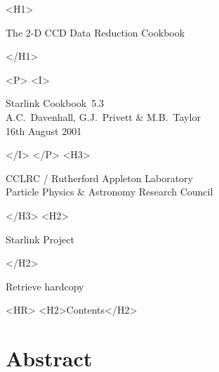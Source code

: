 \documentclass[twoside,11pt]{article}
\newcommand{\stardoccategory}  {Starlink Cookbook}
\newcommand{\stardocsource}    {sc\stardocnumber}
\newcommand{\stardocnumber}    {5.3}
\newcommand{\stardocauthors}   {A.C.~Davenhall, G.J.~Privett \& M.B.~Taylor}
\newcommand{\stardocdate}      {16th August 2001}
\newcommand{\stardoctitle}     {The 2-D CCD Data Reduction Cookbook}
\newcommand{\htmladdnormallink}[2]{#1}
\newcommand{\htmladdimg}[1]{}
\newcommand{\htmlref}[2]{#1}
\newcommand{\htmladdtonavigation}[1]{}
\newcommand{\xlabel}[1]{}
\newcommand{\latexonlytoc}[0]{\tableofcontents}
\newcommand{\latexonlylof}[0]{\listoffigures}
\newcommand{\latexonlylot}[0]{\listoftables}
\begin{document}
\begin{htmlonly}
   \xlabel{}
   \begin{rawhtml} <H1> \end{rawhtml}
      \stardoctitle
   \begin{rawhtml} </H1> \end{rawhtml}


   \begin{rawhtml} <P> <I> \end{rawhtml}
   \stardoccategory\ \stardocnumber \\
   \stardocauthors \\
   \stardocdate
   \begin{rawhtml} </I> </P> <H3> \end{rawhtml}
      \htmladdnormallink{CCLRC}{http://www.cclrc.ac.uk} /
      \htmladdnormallink{Rutherford Appleton Laboratory}
                        {http://www.cclrc.ac.uk/ral} \\
      \htmladdnormallink{Particle Physics \& Astronomy Research Council}
                        {http://www.pparc.ac.uk} \\
   \begin{rawhtml} </H3> <H2> \end{rawhtml}
      \htmladdnormallink{Starlink Project}{http://star-www.rl.ac.uk/}
   \begin{rawhtml} </H2> \end{rawhtml}
   \htmladdnormallink{\htmladdimg{source.gif} Retrieve hardcopy}
      {http://star-www.rl.ac.uk/cgi-bin/hcserver?\stardocsource}\\

  \label{stardoccontents}
  \begin{rawhtml} 
    <HR>
    <H2>Contents</H2>
  \end{rawhtml}
  \newcommand{\latexonlytoc}[0]{}
  \newcommand{\latexonlylof}[0]{}
  \newcommand{\latexonlylot}[0]{}
  \htmladdtonavigation{\htmlref{\htmladdimg{contents_motif.gif}}
        {stardoccontents}}

  \section{\xlabel{abstract}Abstract}
\end{htmlonly}
\end{document}
